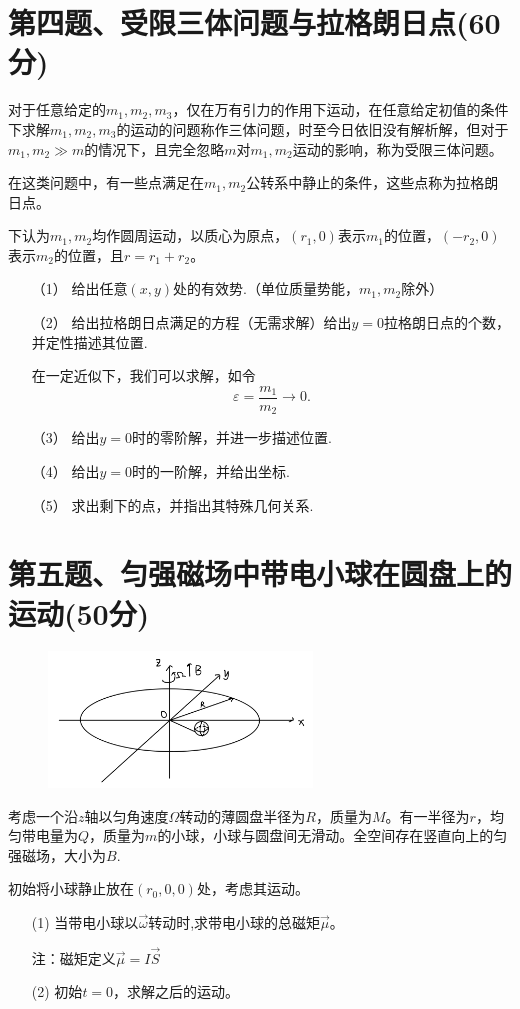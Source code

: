 \documentclass{article}
\begin{document}
\section*{第四题、受限三体问题与拉格朗日点(60分)}
	对于任意给定的$m_1,m_2,m_3$，仅在万有引力的作用下运动，在任意给定初值的条件下求解$m_1,m_2,m_3$的运动的问题称作三体问题，时至今日依旧没有解析解，但对于$m_1,m_2\gg m$的情况下，且完全忽略$m$对$m_1,m_2$运动的影响，称为受限三体问题。\par
	在这类问题中，有一些点满足在$m_1,m_2$公转系中静止的条件，这些点称为拉格朗日点。\par
	下认为$m_1,m_2$均作圆周运动，以质心为原点，$(r_1,0)$表示$m_1$的位置，$(-r_2,0)$表示$m_2$的位置，且$r=r_1+r_2$。\par
\begin{itemize}
\item[（1）]	给出任意$(x,y)$处的有效势.（单位质量势能，$m_1,m_2$除外）
\item[（2）]	给出拉格朗日点满足的方程（无需求解）给出$y=0$拉格朗日点的个数，并定性描述其位置.\par
在一定近似下，我们可以求解，如令
$$\varepsilon=\dfrac{m_1}{m_2}\to 0.$$
\item[（3）]	给出$y=0$时的零阶解，并进一步描述位置.
\item[（4）]	给出$y=0$时的一阶解，并给出坐标.
\item[（5）]	求出剩下的点，并指出其特殊几何关系.
\end{itemize}

\section*{第五题、匀强磁场中带电小球在圆盘上的运动(50分)}
\begin{figure}
	\vspace{-15pt}    %
	\includegraphics[width=7cm]{img/5.1.jpeg}\\
	\vspace{-15pt}    %
	\vspace{-15pt}    %
\end{figure}
考虑一个沿$z$轴以匀角速度$\Omega$转动的薄圆盘半径为$R$，质量为$M$。有一半径为$r$，均匀带电量为$Q$，质量为$m$的小球，小球与圆盘间无滑动。全空间存在竖直向上的匀强磁场，大小为$B$.\par
初始将小球静止放在$(r_0,0,0)$处，考虑其运动。\par
\begin{itemize}
\item[(1)]当带电小球以$\vec{\omega}$转动时,求带电小球的总磁矩$\vec{\mu}$。\par
注：磁矩定义$\vec{\mu}=I\vec{S}$\par
\item[(2)]初始$t=0$，求解之后的运动。
\end{itemize}
\end{document}
